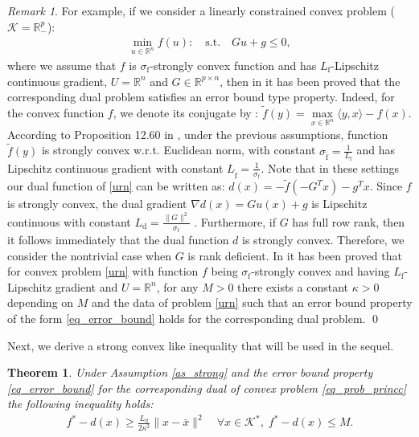 \documentclass{gOMS2e}
\theoremstyle{plain}
\newtheorem{theorem}{Theorem}[section]
\theoremstyle{definition}
\theoremstyle{remark}
\newtheorem{remark}{Remark}
\begin{document}
\begin{remark}
For example, if we consider  a linearly constrained convex  problem (${\mathcal{K}} = {\mathbb{R}}^p_{-}$):
\begin{align}
\label{urn} \min_{u \in {\mathbb{R}}^n} f(u): \quad \text{s.t.} \quad Gu +
g \leq 0,
\end{align}
where we assume that $f$  is $\sigma_\text{f}$-strongly convex
function and  has $L_{\text{f}}$-Lipschitz continuous
gradient, $U = {\mathbb{R}}^n$ and $G \in {\mathbb{R}}^{p \times n}$, then   in \cite{LuoTse:92a,NecNed:14a,WanLin:13} it has been
proved that the corresponding dual problem satisfies an error bound type property. Indeed,  for the convex function $f$, we denote its conjugate by \cite{RocWet:98}: $ \tilde{f}(y) =    \max \limits_{x \in {\mathbb{R}}^{n}} \langle y, x \rangle - f(x)$. According to Proposition 12.60 in \cite{RocWet:98}, under the previous assumptions,  function $\tilde{f}(y)$ is strongly
convex w.r.t. Euclidean norm, with constant
$\sigma_{\tilde{\mathrm{f}}}= \frac{1}{L_{{\mathrm{f}}}}$ and has
Lipschitz continuous gradient with constant $L_{\tilde{\mathrm{f}}}=
\frac{1}{\sigma_{{\mathrm{f}}}}$. Note that in these settings our
dual function of \eqref{urn} can be written as: $d(x)=-\tilde{f}(-G^T x)-g^T x$.  Since $f$ is strongly convex, the dual gradient $\nabla d(x) =  G u(x) + g$ is Lipschitz continuous with constant $L_\text{d} = \frac{\|G\|^2}{\sigma_\text{f}}$
\cite{Nes:05}. Furthermore, if  $G$ has full row rank, then it
follows immediately that the dual function $d$ is strongly convex.
Therefore,  we consider  the nontrivial case when $G$ is rank
deficient. In \cite{LuoTse:92a,NecNed:14a,WanLin:13} it has been  proved that
for convex problem \eqref{urn} with
function $f$ being  $\sigma_{\text{f}}$-strongly convex and  having
$L_{\text{f}}$-Lipschitz gradient and $U = {\mathbb{R}}^n$,  for any $M>0$ there exists a constant  $\kappa > 0$ depending
on $M$ and the data of problem \eqref{urn} such that an
error bound property of the form \eqref{eq_error_bound} holds for the  corresponding dual problem. \qed
\end{remark}

\noindent Next, we derive a strong convex like inequality that will be used in the sequel.
\begin{theorem}
Under Assumption \eqref{as_strong} and the error bound property \eqref{eq_error_bound} for the  corresponding dual  of convex  problem \eqref{eq_prob_princc} the following inequality holds:
\begin{align}
\label{slr}
f^*  - d(x) \geq \frac{L_\text{d}}{2 \kappa^2} \| x - \bar{x}\|^2   \quad \forall x \in {{\mathcal{K}}^*}, \; f^* - d(x) \leq M.
\end{align}
\end{theorem}
\end{document}
